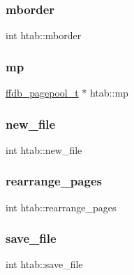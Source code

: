 \mbox{\label{structhtab_a3d3e7570e07708a89d0e835609310464}} 
\subsubsection{\texorpdfstring{mborder}{mborder}}
{\footnotesize\ttfamily int htab\+::mborder}

\mbox{\label{structhtab_a414fc5f3e4460bddfaae9f47613ae768}} 
\subsubsection{\texorpdfstring{mp}{mp}}
{\footnotesize\ttfamily \mbox{\hyperlink{adat-devel_2other__libs_2filedb_2filehash_2ffdb__pagepool_8h_a73290f737b0e5f8be90a0fa96ddf6ab6}{ffdb\+\_\+pagepool\+\_\+t}} $\ast$ htab\+::mp}

\mbox{\label{structhtab_ac52b8a6b13ecefc3a22bc34cc6086765}} 
\subsubsection{\texorpdfstring{new\_file}{new\_file}}
{\footnotesize\ttfamily int htab\+::new\+\_\+file}

\mbox{\label{structhtab_af3b2be98fadf5037c0b44dedc5c2c08d}} 
\subsubsection{\texorpdfstring{rearrange\_pages}{rearrange\_pages}}
{\footnotesize\ttfamily int htab\+::rearrange\+\_\+pages}

\mbox{\label{structhtab_ae130587a915749306b8f12b54c592545}} 
\subsubsection{\texorpdfstring{save\_file}{save\_file}}
{\footnotesize\ttfamily int htab\+::save\+\_\+file}

